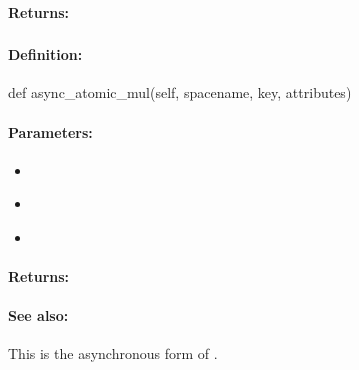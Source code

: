 \paragraph{Returns:}


\pagebreak
\subsubsection{}
\label{api:python:async_atomic_mul}


\paragraph{Definition:}
\begin{pythoncode}
def async_atomic_mul(self, spacename, key, attributes)
\end{pythoncode}

\paragraph{Parameters:}
\begin{itemize}[noitemsep]
\item {}\\

\item {}\\

\item {}\\

\end{itemize}

\paragraph{Returns:}


\paragraph{See also:}  This is the asynchronous form of .

\pagebreak
\subsubsection{}
\label{api:python:uxact_atomic_mul}


